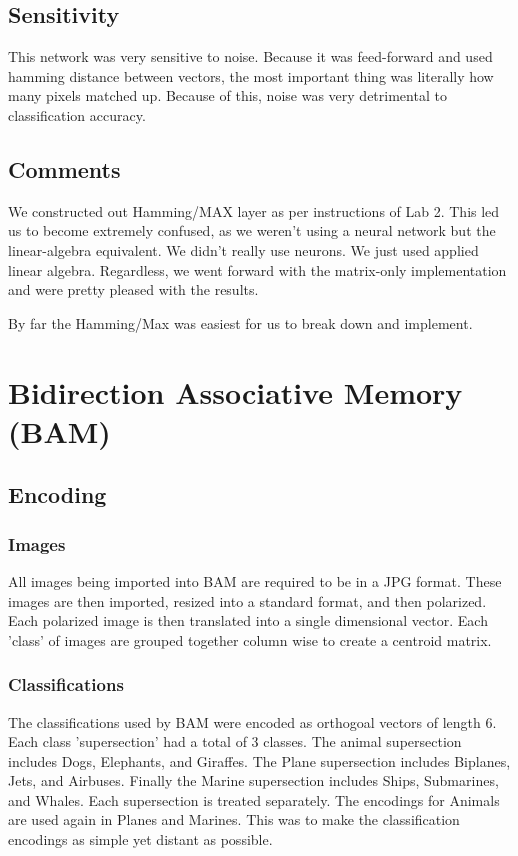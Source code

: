 \documentclass{article}
\begin{document}
\subsection{Sensitivity}
This network was very sensitive to noise. Because it was feed-forward and used hamming distance between vectors, the most important thing was literally how many pixels matched up. Because of this, noise was very detrimental to classification accuracy.

\subsection{Comments}
We constructed out Hamming/MAX layer as per instructions of Lab 2. This led us to become extremely confused, as we weren't using a neural network but the linear-algebra equivalent. We didn't really use neurons. We just used applied linear algebra. Regardless, we went forward with the matrix-only implementation and were pretty pleased with the results. 

By far the Hamming/Max was easiest for us to break down and implement.

\section{Bidirection Associative Memory (BAM)}

\subsection{Encoding}
\subsubsection{Images}
All images being imported into BAM are required to be in a JPG format. These 
images are then imported, resized into a standard format, and then polarized. 
Each polarized image is then translated into a single dimensional vector. 
Each 'class' of images are grouped together column wise to create a centroid 
matrix.

\subsubsection{Classifications}
The classifications used by BAM were encoded as orthogoal vectors of length 6. 
Each class 'supersection' had a total of 3 classes. The animal supersection 
includes Dogs, Elephants, and Giraffes. The Plane supersection includes Biplanes, 
Jets, and Airbuses. Finally the Marine supersection includes Ships, Submarines, 
and Whales. Each supersection is treated separately. The encodings for Animals 
are used again in Planes and Marines. This was to make the classification 
encodings as simple yet distant as possible.
\end{document}
